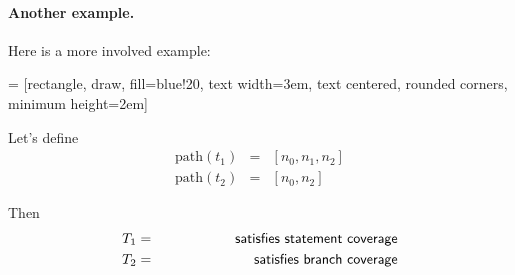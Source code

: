 \documentclass[11pt]{article}
\begin{document}
\paragraph{Another example.} Here is a more involved example:

 = [rectangle, draw, fill=blue!20, 
    text width=3em, text centered, rounded corners, minimum height=2em]

\begin{center}
\end{center}

Let's define
\begin{eqnarray*}
\mbox{path}(t_1) &=& [n_0, n_1, n_2] \\
\mbox{path}(t_2) &=& [n_0, n_2] 
\end{eqnarray*}

Then 
\begin{eqnarray*}
T_1 &=& \hspace*{5em} \mbox{\sf satisfies statement coverage}\\
T_2 &=& \hspace*{5em} \mbox{\sf satisfies branch coverage}
\end{eqnarray*}
\end{document}
